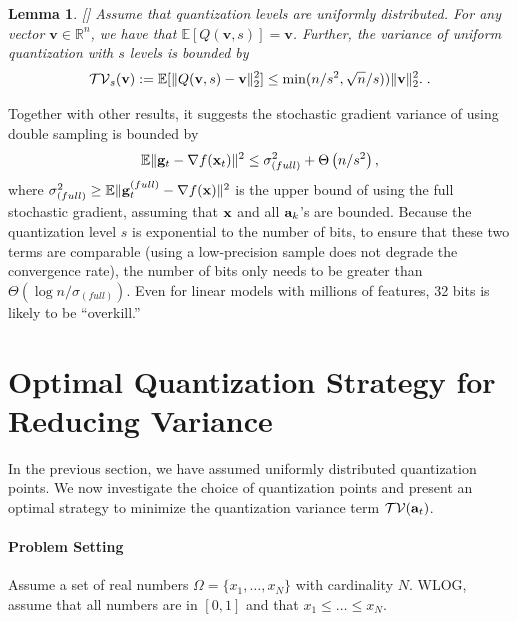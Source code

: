 \documentclass{article}
\newcommand{\R}{\mathbb{R}}
\renewcommand{\vec}[1]{\mathbf{#1}}
\def\a{{\bf a}}
\def\g{{\bf g}}
\def\x{{\bf x}}
\def\v{{\bf v}}
\def\E{\mathbb{E}}
\newtheorem{lemma}{Lemma}
\begin{document}
\begin{lemma}
\label{lem:quant-facts} [\cite{Alistarh:2016:ArXiv}]
Assume that quantization levels are uniformly distributed. For any vector $\vec{v} \in \R^n$, we have that $\E [Q (\vec{v},s)] = \vec{v}$. Further, the variance of uniform quantization with $s$ levels is bounded by
\[
\mathcal{TV}_s(\v):=\E [\| Q (\vec{v},s) - \v\|_2^2] \leq \min( n/s^2,\sqrt{n}/s)) \| \vec{v} \|_2^2. \; .
\]
\end{lemma} 

\vspace{-1em}
Together with other results, it suggests the stochastic gradient variance of using double sampling is bounded by
\[
\E\|\g_t - \nabla f(\x_t)\|^2 \leq \sigma^2_{(full)} + \Theta \left( {n /s^2} \right),
\]
where $\sigma^2_{(full)} \geq \E \|\g_t^{(full)} - \nabla f(\x)\|^2$ is the upper bound of using the full stochastic gradient, assuming that $\x$ and all $\a_k$'s are bounded. Because the quantization level $s$ is exponential to the number of bits, to ensure that these two terms are comparable (using a low-precision sample does not degrade the convergence rate), the number of bits only needs to be greater than $\Theta (\log n /\sigma_{(full)})$. Even for linear models with millions
of features, 32 bits is likely to be  ``overkill.''






\vspace{-1em}
\section{Optimal Quantization Strategy for Reducing Variance} \label{sec:optimal}

\vspace{-0.5em}

In the previous section, we have assumed uniformly distributed quantization points.  
We now investigate the choice of quantization points and present an optimal strategy to minimize the quantization variance term $\mathcal{TV}(\a_t)$.

\vspace{-1em}
\paragraph*{Problem Setting}
Assume a set of real numbers $\Omega = \{x_1, \ldots, x_N\}$ with cardinality $N$. WLOG, assume that all numbers are in $[0, 1]$ and that $x_1 \leq \ldots \leq x_N$. 
\end{document}
